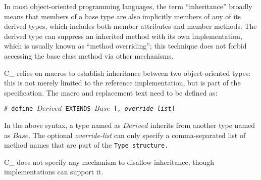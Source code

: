 In most object-oriented programming languages, the term ``inheritance'' broadly
means that members of a base type are also implicitly members of any of its
derived types, which includes both member attributes and member methods.
The derived type can suppress an inherited method with its own implementation,
which is usually known as ``method overriding''; this technique does
not forbid accessing the base class method via other mechanisms.

C\_ relies on macros to establish inheritance between two
object-oriented types: this is not merely limited to the
reference implementation, but is part of the specification.
The macro and replacement text need to be defined as:

\begin{center}

\tt{# define} $Derived$\tt{_EXTENDS} $Base$ [, \textit{override-list}]

\end{center}

In the above syntax, a type named as $Derived$
inherits from another  type named as $Base$.
The optional \textit{override-list} can only specify a comma-separated
list of method names that are part of the \tt{Type} structure.

\note C\_ does not specify any mechanism to disallow
inheritance, though implementations can support it.
